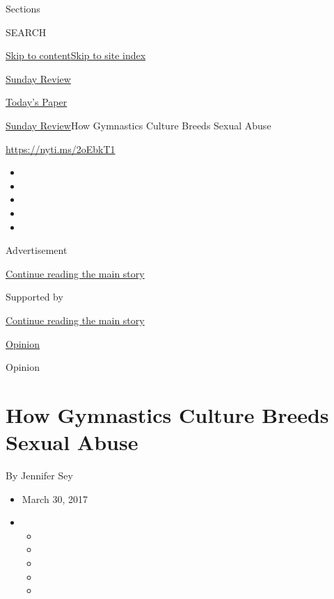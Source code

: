 Sections

SEARCH

\protect\hyperlink{site-content}{Skip to
content}\protect\hyperlink{site-index}{Skip to site index}

\href{https://www.nytimes.com/section/opinion/sunday}{Sunday Review}

\href{https://myaccount.nytimes.com/auth/login?response_type=cookie\&client_id=vi}{}

\href{https://www.nytimes.com/section/todayspaper}{Today's Paper}

\href{/section/opinion/sunday}{Sunday Review}\textbar{}How Gymnastics
Culture Breeds Sexual Abuse

\url{https://nyti.ms/2oEbkT1}

\begin{itemize}
\item
\item
\item
\item
\item
\end{itemize}

Advertisement

\protect\hyperlink{after-top}{Continue reading the main story}

Supported by

\protect\hyperlink{after-sponsor}{Continue reading the main story}

\href{/section/opinion}{Opinion}

Opinion

\hypertarget{how-gymnastics-culture-breeds-sexual-abuse}{%
\section{How Gymnastics Culture Breeds Sexual
Abuse}\label{how-gymnastics-culture-breeds-sexual-abuse}}

By Jennifer Sey

\begin{itemize}
\item
  March 30, 2017
\item
  \begin{itemize}
  \item
  \item
  \item
  \item
  \item
  \end{itemize}
\end{itemize}

